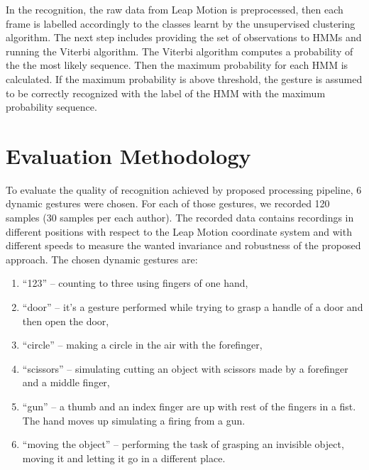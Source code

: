 In the recognition, the raw data from Leap Motion is preprocessed, then each frame is labelled accordingly to the classes learnt by the unsupervised clustering algorithm.
The next step includes providing the set of observations to HMMs and running the Viterbi algorithm.
The Viterbi algorithm computes a probability of the the most likely sequence.
Then the maximum probability for each HMM is calculated.
If the maximum probability is above threshold, the gesture is assumed to be correctly recognized with the label of the HMM with the maximum probability sequence.


\section{Evaluation Methodology}\label{dynamic:set}

To evaluate the quality of recognition achieved by proposed processing pipeline, $6$ dynamic gestures were chosen.
For each of those gestures, we recorded 120 samples (30 samples per each author).
The recorded data contains recordings in different positions with respect to the Leap Motion coordinate system and with different speeds to measure the wanted invariance and robustness of the proposed approach.
The chosen dynamic gestures are:
\begin{enumerate}
\item ``123'' -- counting to three using fingers of one hand,
\item ``door'' -- it's a gesture performed while trying to grasp a handle of a door and then open the door,
\item ``circle'' -- making a circle in the air with the forefinger,
\item ``scissors'' -- simulating cutting an object with scissors made by a forefinger and a middle finger,
\item ``gun'' -- a thumb and an index finger are up with rest of the fingers in a fist. The hand moves up simulating a firing from a gun.
\item ``moving the object'' -- performing the task of grasping an invisible object, moving it and letting it go in a different place.
\end{enumerate}

